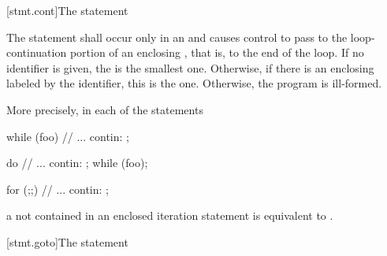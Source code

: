 \documentclass[ebook,10pt,oneside,openany,final]{memoir}
\begin{document}
[stmt.cont]{The  statement}%

\begin{shaded}

\pnum
The  statement shall occur only in an  and causes control to pass to the loop-continuation portion of an enclosing , that is, to the end of the loop.  If no identifier is given, the  is the smallest one.  Otherwise, if there is an enclosing  labeled by the identifier, this is the one.  Otherwise, the program is ill-formed.

\end{shaded}


More precisely, in each of the statements



\begin{minipage}{.30\hsize}
\begin{codeblock}
while (foo) {
  {
    // ...
  }
contin: ;
}
\end{codeblock}
\end{minipage}
\begin{minipage}{.30\hsize}
\begin{codeblock}
do {
  {
    // ...
  }
contin: ;
} while (foo);
\end{codeblock}
\end{minipage}
\begin{minipage}{.30\hsize}
\begin{codeblock}
for (;;) {
  {
    // ...
  }
contin: ;
}
\end{codeblock}
\end{minipage}

a  not contained in an enclosed iteration statement is
equivalent to  .

[stmt.goto]{The  statement}%
\end{document}
